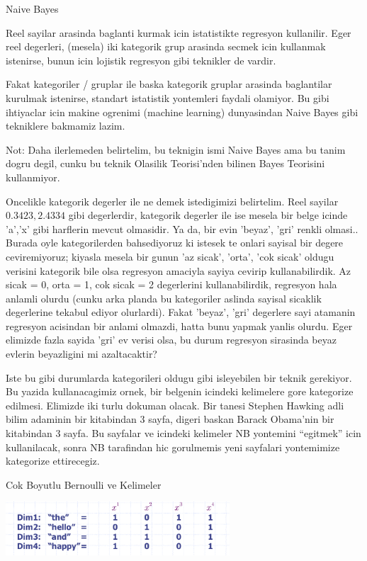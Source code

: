 \documentclass[12pt,fleqn]{article}\usepackage{../common}
\begin{document}
Naive Bayes

Reel sayilar arasinda baglanti kurmak icin istatistikte regresyon
kullanilir. Eger reel degerleri, (mesela) iki kategorik grup arasinda secmek
icin kullanmak istenirse, bunun icin lojistik regresyon gibi teknikler de
vardir.

Fakat kategoriler / gruplar ile baska kategorik gruplar arasinda
baglantilar kurulmak istenirse, standart istatistik yontemleri faydali
olamiyor. Bu gibi ihtiyaclar icin makine ogrenimi (machine learning)
dunyasindan Naive Bayes gibi tekniklere bakmamiz lazim.

Not: Daha ilerlemeden belirtelim, bu teknigin ismi Naive Bayes ama bu tanim
dogru degil, cunku bu teknik Olasilik Teorisi'nden bilinen Bayes Teorisini
kullanmiyor.

Oncelikle kategorik degerler ile ne demek istedigimizi belirtelim. Reel
sayilar $0.3423, 2.4334$ gibi degerlerdir, kategorik degerler ile ise
mesela bir belge icinde 'a','x' gibi harflerin mevcut olmasidir. Ya da, bir
evin 'beyaz', 'gri' renkli olmasi.. Burada oyle kategorilerden bahsediyoruz
ki istesek te onlari sayisal bir degere ceviremiyoruz; kiyasla mesela bir
gunun 'az sicak', 'orta', 'cok sicak' oldugu verisini kategorik bile olsa
regresyon amaciyla sayiya cevirip kullanabilirdik. Az sicak = 0, orta = 1,
cok sicak = 2 degerlerini kullanabilirdik, regresyon hala anlamli olurdu
(cunku arka planda bu kategoriler aslinda sayisal sicaklik degerlerine
tekabul ediyor olurlardi). Fakat 'beyaz', 'gri' degerlere sayi atamanin
regresyon acisindan bir anlami olmazdi, hatta bunu yapmak yanlis
olurdu. Eger elimizde fazla sayida 'gri' ev verisi olsa, bu durum regresyon
sirasinda beyaz evlerin beyazligini mi azaltacaktir?

Iste bu gibi durumlarda kategorileri oldugu gibi isleyebilen bir teknik
gerekiyor. Bu yazida kullanacagimiz ornek, bir belgenin icindeki kelimelere
gore kategorize edilmesi. Elimizde iki turlu dokuman olacak. Bir tanesi
Stephen Hawking adli bilim adaminin bir kitabindan 3 sayfa, digeri baskan
Barack Obama'nin bir kitabindan 3 sayfa. Bu sayfalar ve icindeki kelimeler
NB yontemini ``egitmek'' icin kullanilacak, sonra NB tarafindan hic
gorulmemis yeni sayfalari yontemimize kategorize ettirecegiz.

Cok Boyutlu Bernoulli ve Kelimeler

\includegraphics[height=2cm]{dims.png}
\end{document}
